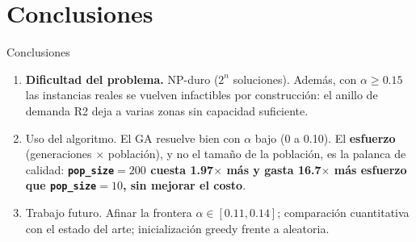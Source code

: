 \documentclass[aspectratio=169, 12pt]{beamer}
\newcommand{\acento}[1]{\textcolor{Verde}{\textbf{#1}}}
\newcommand{\acentob}[1]{\textcolor{Cian}{#1}}
\newcommand{\gris}[1]{\textcolor{GrisAzul}{#1}}
\begin{document}
\section{Conclusiones}

\begin{frame}{Conclusiones}
  \begin{enumerate}
    \item \acento{Dificultad del problema.}
      {\footnotesize NP-duro ($2^n$ soluciones). Además, con $\alpha \geq 0.15$ las instancias reales se vuelven \alert{infactibles por construcción}: el anillo de demanda R2 deja a varias zonas sin capacidad suficiente.}
    \vspace{0.4em}
    \item \acentob{Uso del algoritmo.}
      {\footnotesize El GA resuelve bien con $\alpha$ bajo (0 a 0.10). El \textbf{esfuerzo} (generaciones $\times$ población), y no el tamaño de la población, es la palanca de calidad: \acento{\texttt{pop\_size}$=200$ cuesta 1.97$\times$ más y gasta 16.7$\times$ más esfuerzo que \texttt{pop\_size}$=10$, sin mejorar el costo}.}
    \vspace{0.4em}
    \item \gris{Trabajo futuro.}
      {\footnotesize Afinar la frontera $\alpha \in [0.11, 0.14]$; comparación cuantitativa con el estado del arte; inicialización greedy frente a aleatoria.}
  \end{enumerate}
\end{frame}
\end{document}
